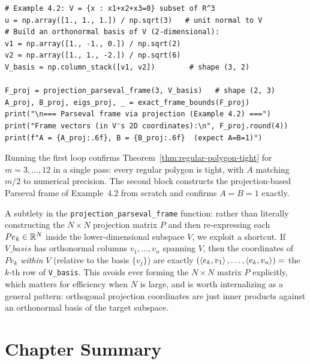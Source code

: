 \begin{lstlisting}[caption={Regular polygon frames and the projection construction}]
# Example 4.2: V = {x : x1+x2+x3=0} subset of R^3
u = np.array([1., 1., 1.]) / np.sqrt(3)   # unit normal to V
# Build an orthonormal basis of V (2-dimensional):
v1 = np.array([1., -1., 0.]) / np.sqrt(2)
v2 = np.array([1., 1., -2.]) / np.sqrt(6)
V_basis = np.column_stack([v1, v2])        # shape (3, 2)

F_proj = projection_parseval_frame(3, V_basis)   # shape (2, 3)
A_proj, B_proj, eigs_proj, _ = exact_frame_bounds(F_proj)
print("\n=== Parseval frame via projection (Example 4.2) ===")
print("Frame vectors (in V's 2D coordinates):\n", F_proj.round(4))
print(f"A = {A_proj:.6f}, B = {B_proj:.6f}  (expect A=B=1)")
\end{lstlisting}

Running the first loop confirms Theorem~\ref{thm:regular-polygon-tight}
for $m=3,\ldots,12$ in a single pass: every regular polygon is tight,
with $A$ matching $m/2$ to numerical precision. The second block
constructs the projection-based Parseval frame of Example~4.2 from
scratch and confirms $A=B=1$ exactly.

\begin{remark*}
A subtlety in the \texttt{projection\_parseval\_frame} function: rather
than literally constructing the $N\times N$ projection matrix $P$ and
then re-expressing each $Pe_k\in\mathbb{R}^N$ inside the lower-dimensional
subspace $V$, we exploit a shortcut. If $V\_basis$ has orthonormal
columns $v_1,\ldots,v_n$ spanning $V$, then the coordinates of $Pe_k$
\emph{within} $V$ (relative to the basis $\{v_j\}$) are exactly
$(\left\langle e_k, v_1 \right\rangle,\ldots,\left\langle e_k, v_n \right\rangle) = $ the $k$-th row of
\texttt{V\_basis}. This avoids ever forming the $N\times N$ matrix $P$
explicitly, which matters for efficiency when $N$ is large, and is worth
internalizing as a general pattern: orthogonal projection coordinates are
just inner products against an orthonormal basis of the target subspace.
\end{remark*}

\section{Chapter Summary}
\label{sec:summary-ch4}

